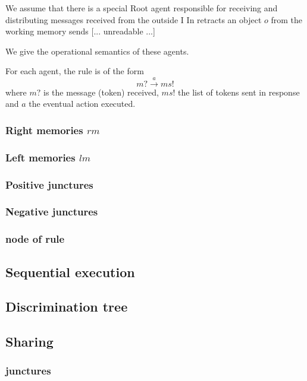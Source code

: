 We assume that there is a special Root agent responsible for receiving and distributing
messages received from the outside I In retracts an object $o$ from the working memory sends
[... unreadable ...]

We give the operational semantics of these agents.

For each agent, the rule is of the form
\begin{equation}
m? \stackrel{a}{\rightarrow} ms!
\end{equation}
where $m?$ is the message (token) received, $ms!$ the list of tokens sent in response and
$a$ the eventual action executed.

\subsubsection{Right memories $rm$}

\subsubsection{Left memories $lm$}

\subsubsection{Positive junctures}

\subsubsection{Negative junctures}

\subsubsection{node of rule}

\subsection{Sequential execution}

\subsection{Discrimination tree}

\subsection{Sharing}

\subsubsection{junctures}

